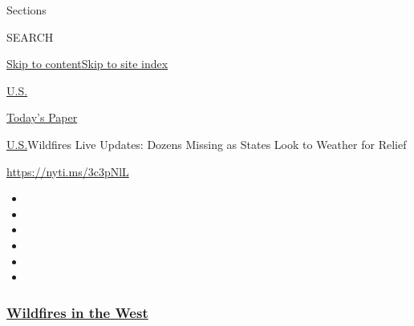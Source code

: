 Sections

SEARCH

\protect\hyperlink{site-content}{Skip to
content}\protect\hyperlink{site-index}{Skip to site index}

\href{https://www.nytimes3xbfgragh.onion/section/us}{U.S.}

\href{https://myaccount.nytimes3xbfgragh.onion/auth/login?response_type=cookie\&client_id=vi}{}

\href{https://www.nytimes3xbfgragh.onion/section/todayspaper}{Today's
Paper}

\href{/section/us}{U.S.}\textbar{}Wildfires Live Updates: Dozens Missing
as States Look to Weather for Relief

\url{https://nyti.ms/3c3pNlL}

\begin{itemize}
\item
\item
\item
\item
\item
\item
\end{itemize}

\hypertarget{wildfires-in-the-west}{%
\subsubsection{\texorpdfstring{\href{https://www.nytimes3xbfgragh.onion/spotlight/california-wildfires?name=styln-california-wildfires\&region=TOP_BANNER\&block=storyline_menu_recirc\&action=click\&pgtype=Article\&impression_id=7e9f47d0-f52e-11ea-aca2-5fcae7f3caf4\&variant=undefined}{Wildfires
in the West}}{Wildfires in the West}}\label{wildfires-in-the-west}}


